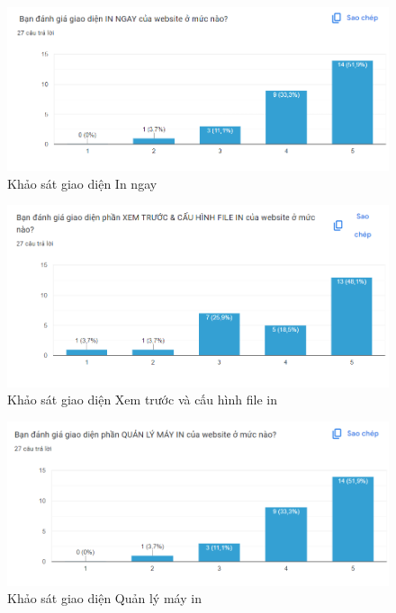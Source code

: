 \begin{figure}[H]
    \begin{center}
        \includegraphics[width=1\textwidth]{Images/Test/test3.png}
        \caption{Khảo sát giao diện In ngay}
    \end{center}
\end{figure}
\begin{figure}[H]
    \begin{center}
        \includegraphics[width=1\textwidth]{Images/Test/test4.png}
        \caption{Khảo sát giao diện Xem trước và cấu hình file in}
    \end{center}
\end{figure}
\begin{figure}[H]
    \begin{center}
        \includegraphics[width=1\textwidth]{Images/Test/test5.png}
        \caption{Khảo sát giao diện Quản lý máy in}
    \end{center}
\end{figure}

